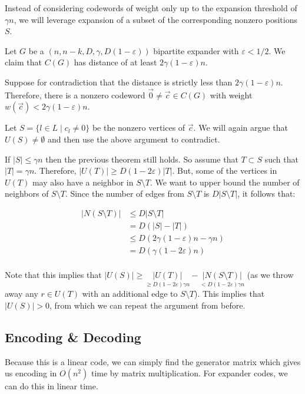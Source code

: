 \documentclass{idc_msc}
\begin{document}
Instead of considering codewords of weight only up to the expansion threshold of \(\gamma n\), we will leverage expansion of a subset of the corresponding nonzero positions \(S\).

Let \(G\) be a \((n, n-k, D, \gamma, D(1-\varepsilon))\) bipartite expander with \(\varepsilon < 1/2\).
We claim that \(C(G)\) has distance of at least \(2 \gamma (1 - \varepsilon) n\).

Suppose for contradiction that the distance is strictly less than \(2 \gamma (1 - \varepsilon) n\).
Therefore, there is a nonzero codeword \(\vec{0} \ne \vec{c} \in C(G)\) with weight \(w(\vec{c}) < 2 \gamma (1 - \varepsilon)n\).

Let \(S = \{l \in L \mid c_l \ne 0\}\) be the nonzero vertices of \(\vec{c}\).
We will again argue that \(U(S) \ne \emptyset\) and then use the above argument to contradict.

If \(|S| \le \gamma n\) then the previous theorem still holds.
So assume that \(T \subset S\) such that \(|T| = \gamma n\).
Therefore, \(|U(T)| \ge D(1-2\varepsilon)|T|\).
But, some of the vertices in \(U(T)\) may also have a neighbor in \(S \setminus T\).
We want to upper bound the number of neighbors of \(S \setminus T\).
Since the number of edges from \(S \setminus T\) is \(D |S \setminus T|\), it follows that:

\[
\begin{aligned}
|N(S \setminus T)|
&\le D|S \setminus T| \\
&= D(|S| - |T|) \\
&\le D(2 \gamma(1-\varepsilon)n - \gamma n) \\
&= D(\gamma (1 - 2 \varepsilon)n) \\
\end{aligned}
\]

Note that this implies that \(|U(S)| \ge \underset{\ge D(1-2\varepsilon)\gamma n}{|U(T)|} - \underset{< D(1-2\varepsilon)\gamma n}{|N(S \setminus T)|}\) (as we throw away any \(r \in U(T)\) with an additional edge to \(S \setminus T\)).
This implies that \(|U(S)| > 0\), from which we can repeat the argument from before.

\clearpage
\subsection{Encoding \& Decoding}

Because this is a linear code, we can simply find the generator matrix which gives us encoding in \(O(n^2)\) time by matrix multiplication.
For expander codes, we can do this in linear time\cite{sipser1996expander}.
\end{document}
